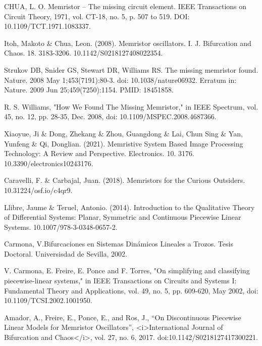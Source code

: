 \documentclass[12pt,a4paper]{report} %
\begin{document}
	
	\begin{thebibliography}{99}
		 CHUA, L. O. Memristor – The missing circuit element. IEEE
		Transactions on Circuit Theory, 1971, vol. CT-18, no. 5, p. 507 to
		519. DOI: 10.1109/TCT.1971.1083337.
		
		 Itoh, Makoto \& Chua, Leon. (2008). Memristor oscillators. I. J. Bifurcation and Chaos. 18. 3183-3206. 10.1142/S0218127408022354. 
		
		 Strukov DB, Snider GS, Stewart DR, Williams RS. The missing memristor found. Nature. 2008 May 1;453(7191):80-3. doi: 10.1038/nature06932. Erratum in: Nature. 2009 Jun 25;459(7250):1154. PMID: 18451858.
		
		 R. S. Williams, "How We Found The Missing Memristor," in IEEE Spectrum, vol. 45, no. 12, pp. 28-35, Dec. 2008, doi: 10.1109/MSPEC.2008.4687366.
		
		 Xiaoyue, Ji \& Dong, Zhekang \& Zhou, Guangdong \& Lai, Chun Sing \& Yan, Yunfeng \& Qi, Donglian. (2021). Memristive System Based Image Processing Technology: A Review and Perspective. Electronics. 10. 3176. 10.3390/electronics10243176. 
		
		 Caravelli, F. \& Carbajal, Juan. (2018). Memristors for the Curious Outsiders. 10.31224/osf.io/c4qr9. 
		
		 Llibre, Jaume \& Teruel, Antonio. (2014). Introduction to the Qualitative Theory of Differential Systems: Planar, Symmetric and Continuous Piecewise Linear Systems. 10.1007/978-3-0348-0657-2. 
		
		 Carmona, V.Bifurcaciones en Sistemas Dinámicos Lineales a Trozos. Tesis Doctoral. Universisdad de Sevilla, 2002.
		
		 V. Carmona, E. Freire, E. Ponce and F. Torres, "On simplifying and classifying piecewise-linear systems," in IEEE Transactions on Circuits and Systems I: Fundamental Theory and Applications, vol. 49, no. 5, pp. 609-620, May 2002, doi: 10.1109/TCSI.2002.1001950.
		
		 Amador, A., Freire, E., Ponce, E., and Ros, J., “On Discontinuous Piecewise Linear Models for Memristor Oscillators”, <i>International Journal of Bifurcation and Chaos</i>, vol. 27, no. 6, 2017. doi:10.1142/S0218127417300221.
		
	\end{thebibliography}
	
	\newpage
	
\end{document}

